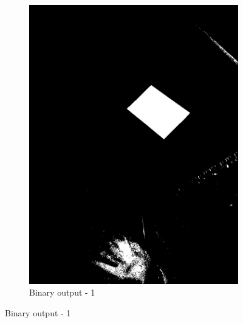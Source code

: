 \documentclass[paper=a4, fontsize=10pt]{scrartcl} %
\numberwithin{equation}{section} %
\numberwithin{figure}{section} %
\begin{document}
\begin{figure}
\begin{subfigure}[b]{0.35\textwidth}
		\includegraphics[width=\textwidth]{binary_01}
		\caption{Binary output - 1}
		\label{fig:binary_output_01}
	\end{subfigure}
	

\end{figure}
\end{document}
